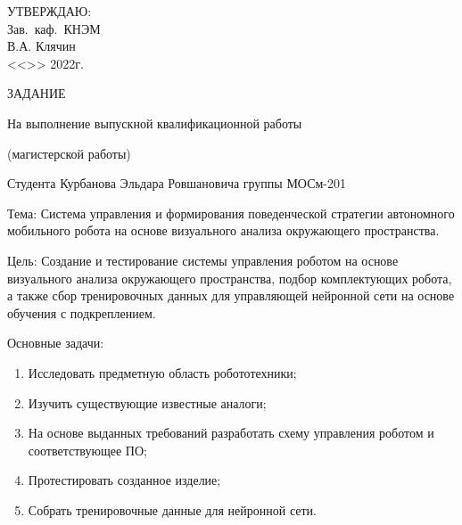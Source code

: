 \thispagestyle{empty}
\begin{center}
\thesisOrganization
\end{center}

\vspace{0.5cm}

\hfill\begin{minipage}{0.4\textwidth}
        УТВЕРЖДАЮ: \\
	Зав.~каф.~КНЭМ \\
	\underline{\hspace{3cm}} В.А. Клячин\\
	<<\underline{\hspace{1cm}}>>\underline{\hspace{3cm}} 2022г.
\end{minipage}

\vspace{1cm}

\begin{center}
ЗАДАНИЕ

На выполнение выпускной квалификационной работы

(магистерской работы)

Студента Курбанова Эльдара Ровшановича группы МОСм-201
\end{center}

\vspace{0.3cm}

\noindent Тема: Система управления и формирования поведенческой стратегии автономного мобильного
робота на основе визуального анализа окружающего пространства.

\noindent Цель: Создание и тестирование системы управления роботом на основе визуального анализа окружающего пространства, подбор комплектующих робота, а также сбор тренировочных данных для управляющей нейронной сети на основе обучения с подкреплением.

\noindent Основные задачи:

\begin{enumerate}
	\item Исследовать предметную область робототехники;
	\item Изучить существующие известные аналоги;
	\item На основе выданных требований разработать схему управления роботом и соответствующее ПО;
	\item Протестировать созданное изделие;
	\item Собрать тренировочные данные для нейронной сети.
\end{enumerate}	

